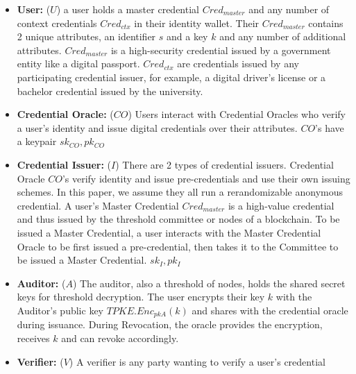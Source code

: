 \begin{itemize}
    \item \textbf{User: }($U$) a user holds a master credential $Cred_{master}$ and any number of context credentials $Cred_{ctx}$ in their identity wallet. Their $Cred_{master}$ contains 2 unique attributes, an identifier $s$ and a key $k$ and any number of additional attributes. $Cred_{master}$ is a high-security credential issued by a government entity like a digital passport. $Cred_{ctx}$ are credentials issued by any participating credential issuer, for example, a digital driver's license or a bachelor credential issued by the university. 

    \item \textbf{Credential Oracle: } ($CO$) Users interact with Credential Oracles who verify a user's identity and issue digital credentials over their attributes. $CO$'s have a keypair $sk_{CO}, pk_{CO}$
    
    \item \textbf{Credential Issuer: } ($I$) There are 2 types of credential issuers. Credential Oracle $CO$'s verify identity and issue pre-credentials and use their own issuing schemes. In this paper, we assume they all run a rerandomizable anonymous credential. A user's Master Credential $Cred_{master}$ is a high-value credential and thus issued by the threshold committee or nodes of a blockchain. To be issued a Master Credential, a user interacts with the Master Credential Oracle to be first issued a pre-credential, then takes it to the Committee to be issued a Master Credential. $sk_{I}, pk_{I}$

    \item \textbf{Auditor: }($A$) The auditor, also a threshold of nodes, holds the shared secret keys for threshold decryption. The user encrypts their key $k$ with the Auditor's public key $TPKE.Enc_{pkA}(k)$ and shares with the credential oracle during issuance. During Revocation, the oracle provides the encryption, receives $k$ and can revoke accordingly. 

    \item \textbf{Verifier: } ($V$) A verifier is any party wanting to verify a user's credential
    
\end{itemize}


